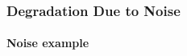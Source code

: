 \documentclass{beamer}
\begin{document}
\begin{frame}
\frametitle{Degradation Due to Noise}
\framesubtitle{Noise example}
\begin{columns}
\end{columns}
\end{frame}
\end{document}

